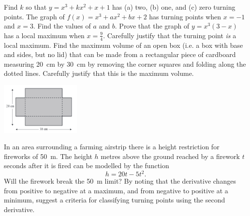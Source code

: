\begin{questions}
  \question Find $ k $ so that $ y = x^3 + kx^2 + x + 1 $ has (a) two, (b) one, and (c) zero turning points.
  \question The graph of $ f(x) = x^3 + ax^2 + bx + 2 $ has turning points when $ x = -1 $ and $ x = 3 $. Find the values of $ a $ and $ b $.
  \question Prove that the graph of $ y = x^3(3 - x) $ has a local maximum when $ x = \frac{9}{4} $. Carefully justify that the turning point
            \emph{is} a local maximum.
  \question Find the maximum volume of an open box (i.e. a box with base and sides, but no lid) that can be made from a rectangular piece of
            cardboard measuring \SI{20}{\centi\metre} by \SI{30}{\centi\metre} by removing the corner squares and folding along the dotted
            lines. Carefully justify that this is the maximum volume.
            \begin{center}
              \includegraphics[width=0.3\textwidth]{box}
            \end{center}
  \question In an area surrounding a farming airstrip there is a height restriction for
            fireworks of \SI{50}{\metre}. The height $ h $ metres above the ground reached
            by a firework $ t $ seconds after it is fired can be modelled by the function
            \begin{equation}
              h = 20t - 5t^2.
            \end{equation}
            Will the firework break the \SI{50}{\metre} limit?
  \question By noting that the derivative changes from positive to negative at a maximum, and from negative to positive at a minimum, suggest
            a criteria for classifying turning points using the second derivative.
\end{questions}


